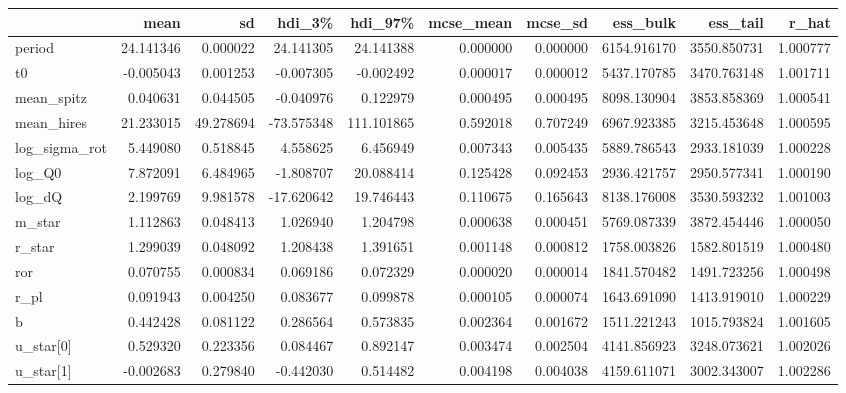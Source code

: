 \begin{tabular}{lrrrrrrrrr}
\toprule
{} &       mean &         sd &     hdi\_3\% &     hdi\_97\% &  mcse\_mean &   mcse\_sd &     ess\_bulk &     ess\_tail &     r\_hat \\
\midrule
period        &  24.141346 &   0.000022 &  24.141305 &   24.141388 &   0.000000 &  0.000000 &  6154.916170 &  3550.850731 &  1.000777 \\
t0            &  -0.005043 &   0.001253 &  -0.007305 &   -0.002492 &   0.000017 &  0.000012 &  5437.170785 &  3470.763148 &  1.001711 \\
mean\_spitz    &   0.040631 &   0.044505 &  -0.040976 &    0.122979 &   0.000495 &  0.000495 &  8098.130904 &  3853.858369 &  1.000541 \\
mean\_hires    &  21.233015 &  49.278694 & -73.575348 &  111.101865 &   0.592018 &  0.707249 &  6967.923385 &  3215.453648 &  1.000595 \\
log\_sigma\_rot &   5.449080 &   0.518845 &   4.558625 &    6.456949 &   0.007343 &  0.005435 &  5889.786543 &  2933.181039 &  1.000228 \\
log\_Q0        &   7.872091 &   6.484965 &  -1.808707 &   20.088414 &   0.125428 &  0.092453 &  2936.421757 &  2950.577341 &  1.000190 \\
log\_dQ        &   2.199769 &   9.981578 & -17.620642 &   19.746443 &   0.110675 &  0.165643 &  8138.176008 &  3530.593232 &  1.001003 \\
m\_star        &   1.112863 &   0.048413 &   1.026940 &    1.204798 &   0.000638 &  0.000451 &  5769.087339 &  3872.454446 &  1.000050 \\
r\_star        &   1.299039 &   0.048092 &   1.208438 &    1.391651 &   0.001148 &  0.000812 &  1758.003826 &  1582.801519 &  1.000480 \\
ror           &   0.070755 &   0.000834 &   0.069186 &    0.072329 &   0.000020 &  0.000014 &  1841.570482 &  1491.723256 &  1.000498 \\
r\_pl          &   0.091943 &   0.004250 &   0.083677 &    0.099878 &   0.000105 &  0.000074 &  1643.691090 &  1413.919010 &  1.000229 \\
b             &   0.442428 &   0.081122 &   0.286564 &    0.573835 &   0.002364 &  0.001672 &  1511.221243 &  1015.793824 &  1.001605 \\
u\_star[0]     &   0.529320 &   0.223356 &   0.084467 &    0.892147 &   0.003474 &  0.002504 &  4141.856923 &  3248.073621 &  1.002026 \\
u\_star[1]     &  -0.002683 &   0.279840 &  -0.442030 &    0.514482 &   0.004198 &  0.004038 &  4159.611071 &  3002.343007 &  1.002286 \\

\end{tabular}
